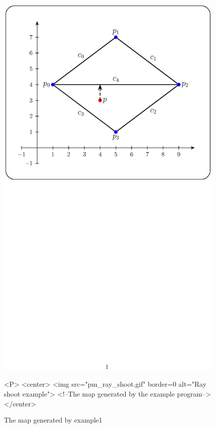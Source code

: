 \begin{figure}[h]
\begin{ccTexOnly}
    \centerline{
      \includegraphics{pm_ray_shoot.ps}
    }
\end{ccTexOnly}

\caption{The map generated by example1
\label{PM_sec:shoot}}

\begin{ccHtmlOnly}
    <P>
    <center>
        <img src="pm_ray_shoot.gif"  border=0 alt="Ray shoot example">
        <!--The map generated by the example program-->
    </center>
\end{ccHtmlOnly}
\end{figure}

